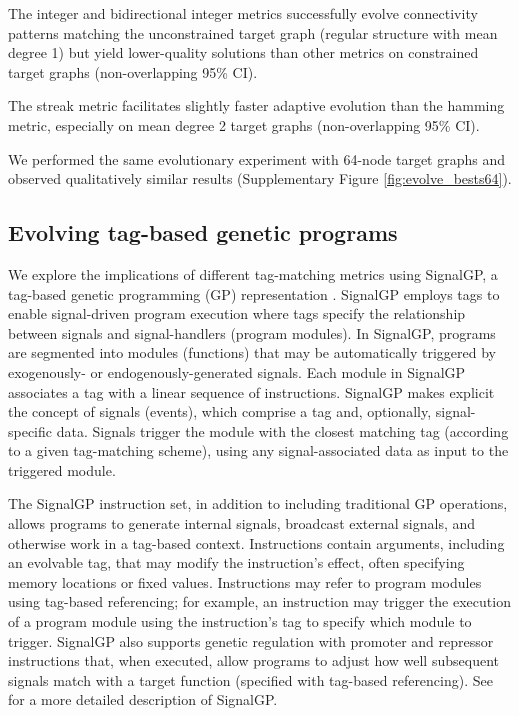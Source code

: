 The integer and bidirectional integer metrics successfully evolve connectivity patterns matching the unconstrained target graph (regular structure with mean degree 1) but yield lower-quality solutions than other metrics on constrained target graphs (non-overlapping 95\% CI).

The streak metric facilitates slightly faster adaptive evolution than the hamming metric, especially on mean degree 2 target graphs (non-overlapping 95\% CI).

We performed the same evolutionary experiment with 64-node target graphs and observed qualitatively similar results (Supplementary Figure \ref{fig:evolve_bests64}).

\subsection{Evolving tag-based genetic programs}

We explore the implications of different tag-matching metrics using SignalGP, a tag-based genetic programming (GP) representation \citep{lalejini2018evolving}.
SignalGP employs tags to enable signal-driven program execution where tags specify the relationship between signals and signal-handlers (program modules).
In SignalGP, programs are segmented into modules (functions) that may be automatically triggered by exogenously- or endogenously-generated signals.
Each module in SignalGP associates a tag with a linear sequence of instructions.
SignalGP makes explicit the concept of signals (events), which comprise a tag and, optionally, signal-specific data.
Signals trigger the module with the closest matching tag (according to a given tag-matching scheme), using any signal-associated data as input to the triggered module.

The SignalGP instruction set, in addition to including traditional GP operations, allows programs to generate internal signals, broadcast external signals, and otherwise work in a tag-based context.
Instructions contain arguments, including an evolvable tag, that may modify the instruction's effect, often specifying memory locations or fixed values.
Instructions may refer to program modules using tag-based referencing; for example, an instruction may trigger the execution of a program module using the instruction's tag to specify which module to trigger.
SignalGP also supports genetic regulation with promoter and repressor instructions that, when executed, allow programs to adjust how well subsequent signals match with a target function (specified with tag-based referencing). %
See \citep{lalejini2018evolving} for a more detailed description of SignalGP.

